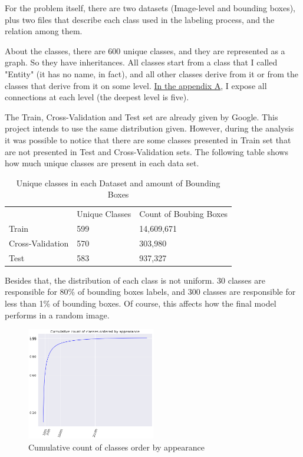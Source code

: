 \documentclass[11pt, a4paper, twocolumn]{article}
\begin{document}
For the problem itself, there are two datasets (Image-level and bounding boxes), plus two files that describe each class used in the labeling process, and the relation among them.

About the classes, there are 600 unique classes, and they are represented as a graph. So they have inheritances. All classes start from a class that I called "Entity" (it has no name, in fact), and all other classes derive from it or from the classes that derive from it on some level. \hyperref[sec:appendix-a]{In the appendix A}, I expose all connections at each level (the deepest level is five).

The Train, Cross-Validation and Test set are already given by Google. This project intends to use the same distribution given. However, during the analysis it was possible to notice that there are some classes presented in Train set that are not presented in Test and Cross-Validation sets. The following table shows how much unique classes are present in each data set.

\begin{table}[ht]
	\footnotesize
	\centering
	\caption{ \footnotesize Unique classes in each Dataset and amount of Bounding Boxes }
	\label{table1}
	\begin{tabular}{lll}
		& Unique Classes & Count of Boubing Boxes \\
		\rowcolor[HTML]{EFEFEF} 
		Train            & 599            & 14,609,671             \\
		Cross-Validation & 570            & 303,980                \\
		\rowcolor[HTML]{EFEFEF} 
		Test             & 583            & 937,327               
	\end{tabular}
\end{table}

Besides that, the distribution of each class is not uniform. 30 classes are responsible for 80\% of bounding boxes labels, and 300 classes are responsible for less than 1\% of bounding boxes. Of course, this affects how the final model performs in a random image.

\begin{figure}[!ht]
	\centering
	\includegraphics[width=0.5\textwidth]{cumulative-classes.png}
	\caption{\scriptsize Cumulative count of classes order by appearance}
\end{figure}
\end{document}
